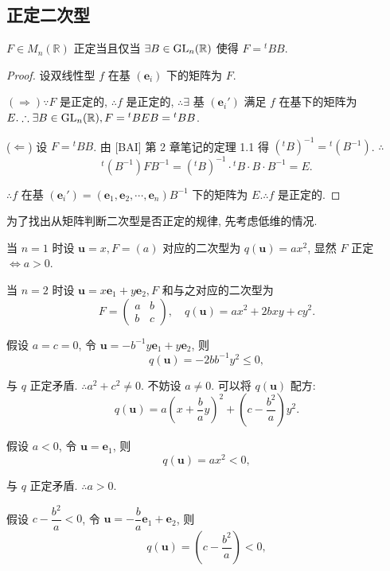 \documentclass[color=black,device=normal,lang=cn,mode=geye]{elegantnote}
\begin{document}
\subsection{正定二次型}
\begin{theorem}[书上的定理 6]
    $F\in M_n(\mathbb{R})$ 正定当且仅当 $\exists B\in\operatorname{GL} _n(\mathbb{R})$ 使得 $F={}^tBB$.
\end{theorem}
\begin{proof}
    设双线性型 $f$ 在基 $(\boldsymbol{e}_i)$ 下的矩阵为 $F$.
    
    $(\Rightarrow)\because F$ 是正定的, $\therefore f$ 是正定的, $\therefore\exists$ 基 $(\boldsymbol{e}_i')$ 满足 $f$ 在基下的矩阵为 $E.\therefore\exists B\in\operatorname{GL} _n(\mathbb{R}),F={}^tBEB={}^tBB$.

    ($\Leftarrow$) 设 $F={}^tBB$. 由 [BAI] 第 2 章笔记的定理 1.1 得 $({}^tB)^{-1}={}^t(B^{-1})$. $\therefore$
    \[{}^t(B^{-1})FB^{-1}=({}^tB)^{-1}\cdot{}^tB\cdot B\cdot B^{-1}=E.\]

    $\therefore f$ 在基 $(\boldsymbol{e}_i')=(\boldsymbol{e}_1,\boldsymbol{e}_2,\cdots,\boldsymbol{e}_n)B^{-1}$ 下的矩阵为 $E.\therefore f$ 是正定的.
\end{proof}
为了找出从矩阵判断二次型是否正定的规律, 先考虑低维的情况.

当 $n=1$ 时设 $\boldsymbol{u}=x,F=(a)$ 对应的二次型为 $q(\boldsymbol{u})=ax^2$, 显然 $F$ 正定 $\Leftrightarrow a>0$.

当 $n=2$ 时设 $\boldsymbol{u}=x\boldsymbol{e}_1+y\boldsymbol{e}_2,F$ 和与之对应的二次型为
\[F=\begin{pmatrix}
    a & b \\
    b & c
\end{pmatrix},\quad q(\boldsymbol{u})=ax^2+2bxy+cy^2.\]

假设 $a=c=0$, 令 $\boldsymbol{u}=-b^{-1}y\boldsymbol{e}_1+y\boldsymbol{e}_2$, 则
\[q(\boldsymbol{u})=-2bb^{-1}y^2\leq0,\]

与 $q$ 正定矛盾. $\therefore a^2+c^2\neq0$. 不妨设 $a\neq0$. 可以将 $q(\boldsymbol{u})$ 配方:
\begin{equation}\label{eq3.2}
    q(\boldsymbol{u})=a\left(x+\dfrac{b}{a}y\right)^2+\left(c-\dfrac{b^2}{a}\right)y^2.
\end{equation}

假设 $a<0$, 令 $\boldsymbol{u}=\boldsymbol{e}_1$, 则
\[q(\boldsymbol{u})=ax^2<0,\]

与 $q$ 正定矛盾. $\therefore a>0$.

假设 $c-\dfrac{b^2}{a}<0$, 令 $\boldsymbol{u}=-\dfrac{b}{a}\boldsymbol{e}_1+\boldsymbol{e}_2$, 则
\[q(\boldsymbol{u})=\left(c-\dfrac{b^2}{a}\right)<0,\]
\end{document}
